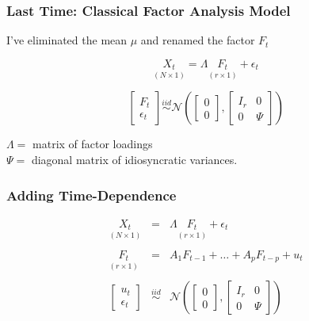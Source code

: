 \documentclass[handout]{beamer}
\begin{document}
\begin{frame}[c]\frametitle{Last Time: Classical Factor Analysis Model}
    

\alert{I've eliminated the mean $\mu$ and renamed the factor $F_t$}

\vspace{1em}
$$\underset{(N\times 1)}{X_t} =  \Lambda \underset{(r\times 1)}{F_t} + \epsilon_t$$

\vspace{2em}

\small

$$
\left[ \begin{array}
	{c} F_t \\ \epsilon_t
\end{array}\right]
\overset{iid}{\sim} \mathcal{N}\left(
\left[ \begin{array}
	{c} 0\\ 0 
\end{array}\right],
\left[ \begin{array}
	{cc} I_r & 0\\
	0 & \Psi
\end{array}\right]\right)$$
\vspace{1em}

$\Lambda = $ matrix of factor loadings\\
$\Psi = $ diagonal matrix of idiosyncratic variances.
\end{frame}
\begin{frame}
	\frametitle{Adding Time-Dependence}

\begin{eqnarray*}
	\underset{(N\times 1)}{X_t} &=&  \Lambda \underset{(r\times 1)}{F_t} + \epsilon_t \\ \\
	\underset{(r\times 1)}{F_t} &=& A_1 F_{t-1} + \hdots + A_p F_{t-p} + u_t \\ \\
	\left[ \begin{array}
	{c} u_t \\ \epsilon_t
\end{array}\right]
&\overset{iid}{\sim}& \mathcal{N}\left(
\left[ \begin{array}
	{c} 0\\ 0 
\end{array}\right],
\left[ \begin{array}
	{cc} I_r & 0\\
	0 & \Psi
\end{array}\right]\right)
\end{eqnarray*}	


\end{frame}
\end{document}
